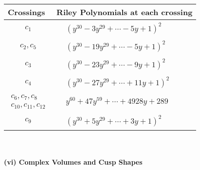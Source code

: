 \documentclass[1p]{elsarticle_modified}
\theoremstyle{definition}
\begin{document}
\begin{tabular}{m{50pt}|m{274pt}}
Crossings & \hspace{64pt}Riley Polynomials at each crossing \\
\hline $$\begin{aligned}c_{1}\end{aligned}$$&$\begin{aligned}
&(y^{30}-3 y^{29}+\cdots-5 y+1)^{2}
\end{aligned}$\\
\hline $$\begin{aligned}c_{2},c_{5}\end{aligned}$$&$\begin{aligned}
&(y^{30}-19 y^{29}+\cdots-5 y+1)^{2}
\end{aligned}$\\
\hline $$\begin{aligned}c_{3}\end{aligned}$$&$\begin{aligned}
&(y^{30}-23 y^{29}+\cdots-9 y+1)^{2}
\end{aligned}$\\
\hline $$\begin{aligned}c_{4}\end{aligned}$$&$\begin{aligned}
&(y^{30}-27 y^{29}+\cdots+11 y+1)^{2}
\end{aligned}$\\
\hline $$\begin{aligned}c_{6},c_{7},c_{8}\\c_{10},c_{11},c_{12}\end{aligned}$$&$\begin{aligned}
&y^{60}+47 y^{59}+\cdots+4928 y+289
\end{aligned}$\\
\hline $$\begin{aligned}c_{9}\end{aligned}$$&$\begin{aligned}
&(y^{30}+5 y^{29}+\cdots+3 y+1)^{2}
\end{aligned}$\\
\hline
\end{tabular}\\~\\
\newpage\flushleft \textbf{(vi) Complex Volumes and Cusp Shapes}
\end{document}
